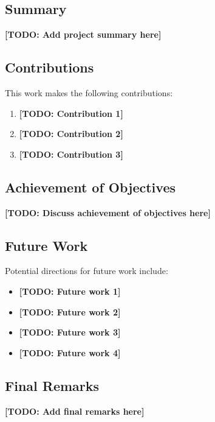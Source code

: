 
\subsection{Summary}


\textbf{[TODO: Add project summary here]}

\subsection{Contributions}


This work makes the following contributions:

\begin{enumerate}
  \item \textbf{[TODO: Contribution 1]}
  \item \textbf{[TODO: Contribution 2]}
  \item \textbf{[TODO: Contribution 3]}
\end{enumerate}

\subsection{Achievement of Objectives}


\textbf{[TODO: Discuss achievement of objectives here]}

\subsection{Future Work}


Potential directions for future work include:

\begin{itemize}
  \item \textbf{[TODO: Future work 1]}
  \item \textbf{[TODO: Future work 2]}
  \item \textbf{[TODO: Future work 3]}
  \item \textbf{[TODO: Future work 4]}
\end{itemize}

\subsection{Final Remarks}


\textbf{[TODO: Add final remarks here]}
